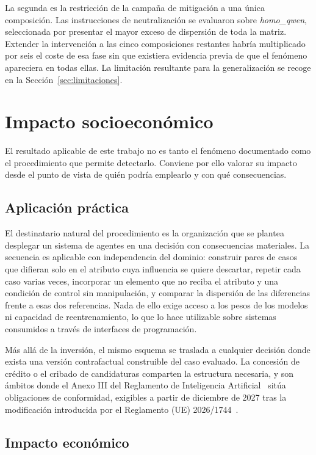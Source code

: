 La segunda es la restricción de la campaña de mitigación a una única composición. Las instrucciones de neutralización se evaluaron sobre \textit{homo\_qwen}, seleccionada por presentar el mayor exceso de dispersión de toda la matriz. Extender la intervención a las cinco composiciones restantes habría multiplicado por seis el coste de esa fase sin que existiera evidencia previa de que el fenómeno apareciera en todas ellas. La limitación resultante para la generalización se recoge en la Sección~\ref{sec:limitaciones}.

\section{Impacto socioeconómico}
\label{sec:impacto_socioeconomico}

El resultado aplicable de este trabajo no es tanto el fenómeno documentado como el procedimiento que permite detectarlo. Conviene por ello valorar su impacto desde el punto de vista de quién podría emplearlo y con qué consecuencias.

\subsection{Aplicación práctica}

El destinatario natural del procedimiento es la organización que se plantea desplegar un sistema de agentes en una decisión con consecuencias materiales. La secuencia es aplicable con independencia del dominio: construir pares de casos que difieran solo en el atributo cuya influencia se quiere descartar, repetir cada caso varias veces, incorporar un elemento que no reciba el atributo y una condición de control sin manipulación, y comparar la dispersión de las diferencias frente a esas dos referencias. Nada de ello exige acceso a los pesos de los modelos ni capacidad de reentrenamiento, lo que lo hace utilizable sobre sistemas consumidos a través de interfaces de programación.

Más allá de la inversión, el mismo esquema se traslada a cualquier decisión donde exista una versión contrafactual construible del caso evaluado. La concesión de crédito o el cribado de candidaturas comparten la estructura necesaria, y son ámbitos donde el Anexo III del Reglamento de Inteligencia Artificial~\cite{ue2024ai_act} sitúa obligaciones de conformidad, exigibles a partir de diciembre de 2027 tras la modificación introducida por el Reglamento (UE) 2026/1744~\cite{ue2026omnibus}.

\subsection{Impacto económico}


